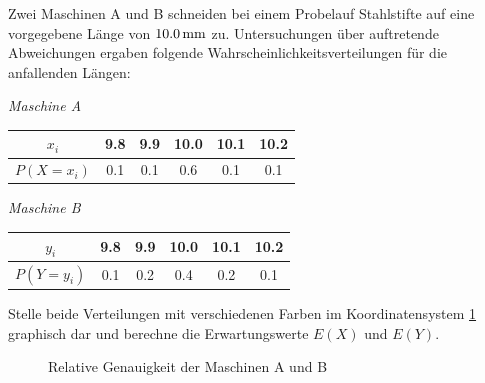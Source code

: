 \documentclass[%
11pt,%
twoside,%
titlepage,%
german,%
headsepline%
]{scrartcl}
\newcommand{\spaltenheight}{\rule{0mm}{3ex}}
\newcommand{\spaltensep}{\\[1ex]}
\begin{document}
\begin{bsp}
Zwei Maschinen A und B schneiden bei einem Probelauf Stahlstifte auf eine vorgegebene Länge von $\unit[10.0]{mm}$ zu. Untersuchungen über auftretende Abweichungen ergaben folgende Wahrscheinlichkeitsverteilungen für die anfallenden Längen:
\begin{center}
\begin{minipage}{7.5cm}
\centering\emph{Maschine A}\\[2ex]
\begin{tabular}{|c|c|c|c|c|c|}
\hline
\rowcolor{Gray}\spaltenheight $x_i$ & 9.8 & 9.9 & 10.0 & 10.1 & 10.2\spaltensep \hline
\rowcolor{lightyellow}\spaltenheight $P(X=x_i)$ & 0.1 & 0.1 & 0.6 & 0.1 & 0.1\spaltensep \hline
\end{tabular}
\end{minipage}

\vspace*{2ex}
\begin{minipage}{7.5cm}
\centering\emph{Maschine B}\\[2ex]
\begin{tabular}{|c|c|c|c|c|c|}
\hline
\rowcolor{Gray}\spaltenheight $y_i$ & 9.8 & 9.9 & 10.0 & 10.1 & 10.2\spaltensep \hline
\rowcolor{lightyellow}\spaltenheight $P(Y=y_i)$ & 0.1 & 0.2 & 0.4 & 0.2 & 0.1\spaltensep \hline
\end{tabular}
\end{minipage}
\end{center}

\begin{ueb}
Stelle beide Verteilungen mit verschiedenen Farben im Koordinatensystem \ref{koordsys} graphisch dar und berechne die Erwartungswerte $E(X)$ und $E(Y)$.
\end{ueb}

\begin{figure}[h]
\centering
{}
\caption{Relative Genauigkeit der Maschinen A und B}\label{koordsys}
\end{figure}
\end{bsp}
\end{document}
